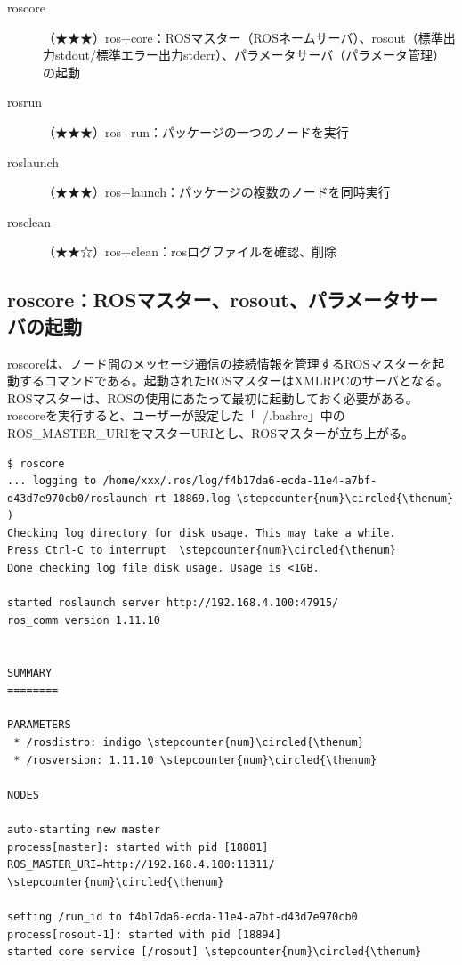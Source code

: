 \vspace{\baselineskip}
\noindent
\begin{description}
\item[roscore]（★★★）ros+core：ROSマスター（ROSネームサーバ）、rosout（標準出力stdout/標準エラー出力stderr）、パラメータサーバ（パラメータ管理）の起動
\item[rosrun]（★★★）ros+run：パッケージの一つのノードを実行
\item[roslaunch]（★★★）ros+launch：パッケージの複数のノードを同時実行
\item[rosclean]（★★☆）ros+clean：rosログファイルを確認、削除
\end{description}

\subsection{roscore：ROSマスター、rosout、パラメータサーバの起動}

roscoreは、ノード間のメッセージ通信の接続情報を管理するROSマスターを起動するコマンドである。起動されたROSマスターはXMLRPCのサーバとなる。ROSマスターは、ROSの使用にあたって最初に起動しておく必要がある。roscoreを実行すると、ユーザーが設定した「~/.bashrc」中のROS\_MASTER\_URIをマスターURIとし、ROSマスターが立ち上がる。

\setcounter{num}{0}

\begin{lstlisting}[language=ROS]
$ roscore
... logging to /home/xxx/.ros/log/f4b17da6-ecda-11e4-a7bf-d43d7e970cb0/roslaunch-rt-18869.log \stepcounter{num}\circled{\thenum} )
Checking log directory for disk usage. This may take a while.
Press Ctrl-C to interrupt  \stepcounter{num}\circled{\thenum}
Done checking log file disk usage. Usage is <1GB.

started roslaunch server http://192.168.4.100:47915/
ros_comm version 1.11.10


SUMMARY
========

PARAMETERS
 * /rosdistro: indigo \stepcounter{num}\circled{\thenum}
 * /rosversion: 1.11.10 \stepcounter{num}\circled{\thenum}

NODES

auto-starting new master
process[master]: started with pid [18881]
ROS_MASTER_URI=http://192.168.4.100:11311/ \stepcounter{num}\circled{\thenum}

setting /run_id to f4b17da6-ecda-11e4-a7bf-d43d7e970cb0
process[rosout-1]: started with pid [18894]
started core service [/rosout] \stepcounter{num}\circled{\thenum}
\end{lstlisting}

